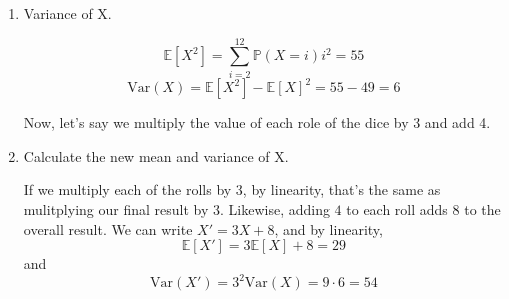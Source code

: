 \documentclass[12pt]{amsart}
\theoremstyle{definition}
\numberwithin{equation}{section}
\theoremstyle{plain}
\newcommand{\E}{\mathbb{E}}
\newcommand{\Var}{\text{Var}}
\renewcommand{\P}{\mathbb{P}}
\begin{document}
\begin{enumerate}[label=\Alph*.]
\item Variance of X.
\begin{answer}
\[
        \E[X^2] = \sum_{i=2}^{12} \P(X = i) i^2 = 55
    \]
    \newline
\[
        \Var (X) = \E[X^2] - \E[X]^2 = 55 - 49 = 6
    \]
\end{answer}

\newline 
Now, let's say we multiply the value of each role of the dice by 3 and add 4. 
\item Calculate the new mean and variance of X.
\begin{answer}
    If we multiply each of the rolls by $3$, by linearity, that's the same as mulitplying our final result by $3$. Likewise, adding $4$ to each roll adds $8$ to the overall result. We can write $X' = 3X + 8$, and by linearity,
    \[
        \E[X'] = 3\E [X] + 8 = 29
    \]
    and
    \[
        \Var(X') = 3^2 \Var (X) = 9\cdot 6 = 54
    \]
\end{answer}
\end{enumerate}
\end{document}
